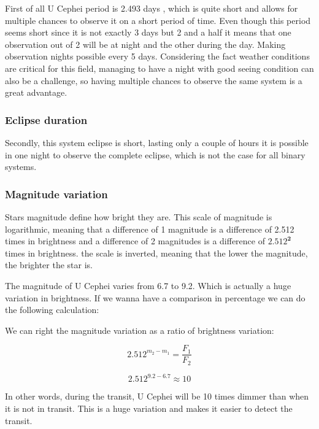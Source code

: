 \documentclass[12pt,a4paper]{article}
\begin{document}
First of all U Cephei period is 2.493 days \cite{VariableStar}, which is quite short and allows for multiple chances to observe it on a short period of time. 
Even though this period seems short since it is not exactly 3 days but 2 and a half it means that one observation out of 2 will be at night and the other during the day.
Making observation nights possible every 5 days.
Considering the fact weather conditions are critical for this field, managing to have a night with good seeing condition can also be a challenge, so having multiple chances to observe the same system is a great advantage.

\subsubsection{Eclipse duration}

Secondly, this system eclipse is short, lasting only a couple of hours it is possible in one night to observe the complete eclipse, which is not the case for all binary systems.

\subsubsection{Magnitude variation}

Stars magnitude define how bright they are. This scale of magnitude is logarithmic, meaning that a difference of 1 magnitude is a difference of 2.512 times in brightness and a difference of 2 magnitudes is a difference of \(\mathbf{2.512^2}\) times in brightness.
the scale is inverted, meaning that the lower the magnitude, the brighter the star is.

The magnitude of U Cephei varies from 6.7 to 9.2. Which is actually a huge variation in brightness. If we wanna have a comparison in percentage we can do the following calculation:

We can right the magnitude variation as a ratio of brightness variation:

\begin{equation}
     2.512^{m_2-m_1} = \frac{F_1}{F_2}
\end{equation}

\begin{equation}
    2.512^{9.2-6.7} \approx 10
\end{equation}

In other words, during the transit, U Cephei will be 10 times dimmer than when it is not in transit. This is a huge variation and makes it easier to detect the transit.
\end{document}
